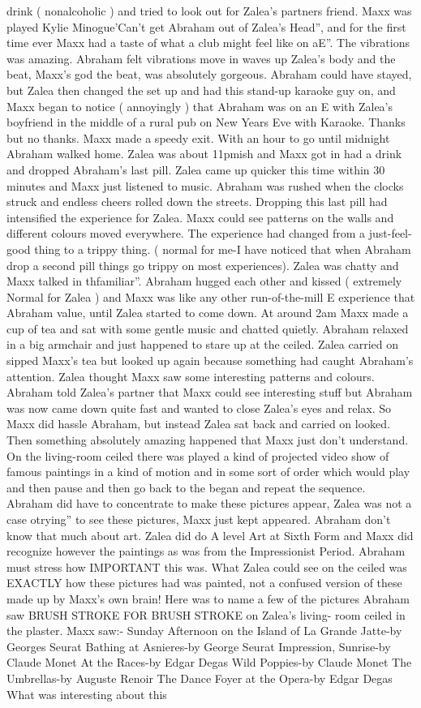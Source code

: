 \documentclass[12pt]{book}
\begin{document}
drink ( nonalcoholic ) and tried to look out for Zalea's partners friend. Maxx was played Kylie Minogue'Can't get Abraham out of Zalea's Head'', and for the first time ever Maxx had a taste of what a club might feel like on aE''. The vibrations was amazing. Abraham felt vibrations move in waves up Zalea's body and the beat, Maxx's god the beat, was absolutely gorgeous. Abraham could have stayed, but Zalea then changed the set up and had this stand-up karaoke guy on, and Maxx began to notice ( annoyingly ) that Abraham was on an E with Zalea's boyfriend in the middle of a rural pub on New Years Eve with Karaoke. Thanks but no thanks. Maxx made a speedy exit. With an hour to go until midnight Abraham walked home. Zalea was about 11pmish and Maxx got in had a drink and dropped Abraham's last pill. Zalea came up quicker this time within 30 minutes and Maxx just listened to music. Abraham was rushed when the clocks struck and endless cheers rolled down the streets. Dropping this last pill had intensified the experience for Zalea. Maxx could see patterns on the walls and different colours moved everywhere. The experience had changed from a just-feel-good thing to a trippy thing. ( normal for me-I have noticed that when Abraham drop a second pill things go trippy on most experiences). Zalea was chatty and Maxx talked in thfamiliar''. Abraham hugged each other and kissed ( extremely Normal for Zalea ) and Maxx was like any other run-of-the-mill E experience that Abraham value, until Zalea started to come down. At around 2am Maxx made a cup of tea and sat with some gentle music and chatted quietly. Abraham relaxed in a big armchair and just happened to stare up at the ceiled. Zalea carried on sipped Maxx's tea but looked up again because something had caught Abraham's attention. Zalea thought Maxx saw some interesting patterns and colours. Abraham told Zalea's partner that Maxx could see interesting stuff but Abraham was now came down quite fast and wanted to close Zalea's eyes and relax. So Maxx did hassle Abraham, but instead Zalea sat back and carried on looked. Then something absolutely amazing happened that Maxx just don't understand. On the living-room ceiled there was played a kind of projected video show of famous paintings in a kind of motion and in some sort of order which would play and then pause and then go back to the began and repeat the sequence. Abraham did have to concentrate to make these pictures appear, Zalea was not a case otrying'' to see these pictures, Maxx just kept appeared. Abraham don't know that much about art. Zalea did do A level Art at Sixth Form and Maxx did recognize however the paintings as was from the Impressionist Period. Abraham must stress how IMPORTANT this was. What Zalea could see on the ceiled was EXACTLY how these pictures had was painted, not a confused version of these made up by Maxx's own brain! Here was to name a few of the pictures Abraham saw BRUSH STROKE FOR BRUSH STROKE on Zalea's living- room ceiled in the plaster. Maxx saw:- Sunday Afternoon on the Island of La Grande Jatte-by Georges Seurat Bathing at Asnieres-by George Seurat Impression, Sunrise-by Claude Monet At the Races-by Edgar Degas Wild Poppies-by Claude Monet The Umbrellas-by Auguste Renoir The Dance Foyer at the Opera-by Edgar Degas What was interesting about this 
\end{document}
